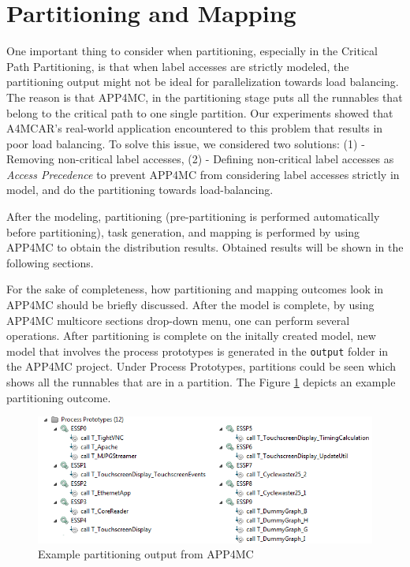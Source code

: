 \section{Partitioning and Mapping}

One important thing to consider when partitioning, especially in the Critical Path Partitioning, is that when label accesses are strictly modeled, the partitioning output might not be ideal for parallelization towards load balancing. The reason is that APP4MC, in the partitioning stage puts all the runnables that belong to the critical path to one single partition. Our experiments showed that A4MCAR's real-world application encountered to this problem that results in poor load balancing. To solve this issue, we considered two solutions: (1) - Removing non-critical label accesses, (2) - Defining non-critical label accesses as \textit{Access Precedence} to prevent APP4MC from considering label accesses strictly in model, and do the partitioning towards load-balancing.

After the modeling, partitioning (pre-partitioning is performed automatically before partitioning), task generation, and mapping is performed by using APP4MC to obtain the distribution results. Obtained results will be shown in the following sections.

For the sake of completeness, how partitioning and mapping outcomes look in APP4MC should be briefly discussed. After the model is complete, by using APP4MC multicore sections drop-down menu, one can perform several operations. After partitioning is complete on the initally created model, new model that involves the process prototypes is generated in the \texttt{output} folder in the APP4MC project. Under Process Prototypes, partitions could be seen which shows all the runnables that are in a partition. The Figure \ref{fig:partitions} depicts an example partitioning outcome.

\begin{figure}[!ht]
	\centering
	\captionsetup{justification=centering}
	\includegraphics[width=\textwidth]{content/images/partitions.png}
	\caption{Example partitioning output from APP4MC}
	\label{fig:partitions}
\end{figure}

